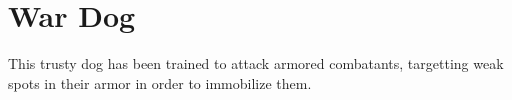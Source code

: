 \section{War Dog}

This trusty dog has been trained to attack armored combatants, targetting weak spots in their armor in order to immobilize them.